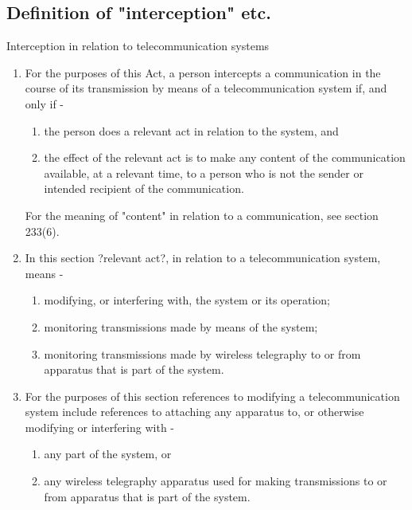 \documentclass[12pt,a4paper]{article}
\begin{document}
	\begin{appendices}
	
		\section{Definition of "interception" etc.}
		Interception in relation to telecommunication systems
	
		\begin{enumerate}
			\item{For the purposes of this Act, a person intercepts a communication in the course of its transmission by means of a telecommunication system if, and only if - }
				\begin{enumerate}
					\item{the person does a relevant act in relation to the system, and}
					\item{the effect of the relevant act is to make any content of the communication available, at a relevant time, to a person who is not the sender or intended recipient of the communication.}
				\end{enumerate}
			For the meaning of "content" in relation to a communication, see section 233(6).
			\item{In this section ?relevant act?, in relation to a telecommunication system, means -}
				
				\begin{enumerate}
					\item{modifying, or interfering with, the system or its operation;}
					\item{monitoring transmissions made by means of the system;}
					\item{monitoring transmissions made by wireless telegraphy to or from apparatus that is part of the system.}
				\end{enumerate}

			\item{For the purposes of this section references to modifying a telecommunication system include references to attaching any apparatus to, or otherwise modifying or interfering with -}
				
				\begin{enumerate}
					\item{any part of the system, or}
					\item{any wireless telegraphy apparatus used for making transmissions to or from apparatus that is part of the system.}
				\end{enumerate}
				

\end{enumerate}
\end{appendices}
\end{document}
